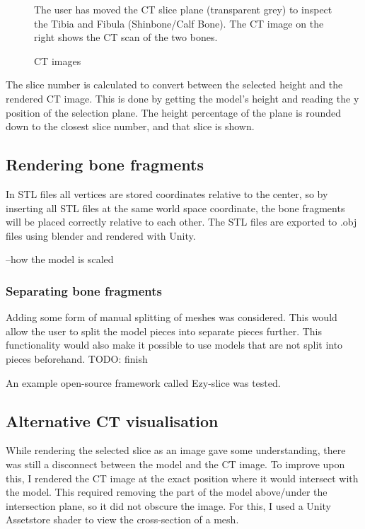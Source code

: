 \documentclass[a4paper]{report}
\begin{document}
\begin{figure}[h!]
    \centering
	\hfill
  \caption{CT images}
  \small
  The user has moved the CT slice plane (transparent grey) to inspect the Tibia and Fibula (Shinbone/Calf Bone). The CT image on the right shows the CT scan of the two bones.
~\cite{mishra_virtual_2019}
\end{figure}

The slice number is calculated to convert between the selected height and the rendered CT image. This is done by getting the model's height and reading the y position of the selection plane. The height percentage of the plane is rounded down to the closest slice number, and that slice is shown.

\subsection{Rendering bone fragments}
In STL files all vertices are stored coordinates relative to the center, so by inserting all STL files at the same world space coordinate, the bone fragments will be placed correctly relative to each other. The STL files are exported to .obj files using blender and rendered with Unity.

--how the model is scaled

\subsubsection{Separating bone fragments}
Adding some form of manual splitting of meshes was considered. This would allow the user to split the model pieces into separate pieces further. This functionality would also make it possible to use models that are not split into pieces beforehand.
TODO: finish

An example open-source framework called Ezy-slice\cite{aryan} was tested.

\subsection{Alternative CT visualisation}
While rendering the selected slice as an image gave some understanding, there was still a disconnect between the model and the CT image. To improve upon this, I rendered the CT image at the exact position where it would intersect with the model.
This required removing the part of the model above/under the intersection plane, so it did not obscure the image. For this, I used a Unity Assetstore shader to view the cross-section of a mesh\cite{aldandarawy_unity_2019}.
\end{document}
